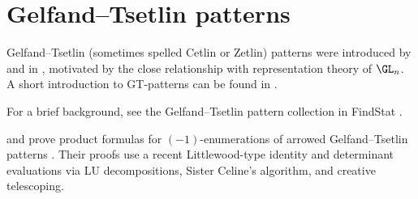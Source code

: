 

\section[gtpatterns]{Gelfand--Tsetlin patterns}

Gelfand--Tsetlin (sometimes spelled Cetlin or Zetlin) patterns
were introduced by  and 
in \cite{GelfandTsetlin1950},
motivated by the close relationship with representation theory of $\GL_n$.
A short introduction to GT-patterns can be found in \cite[p.~103]{StanleyEC2}.

For a brief background, see the Gelfand--Tsetlin pattern collection in
FindStat \cite{FindStatGelfandTsetlinPatterns}.

 and  prove product formulas
for $(-1)$-enumerations of arrowed Gelfand--Tsetlin patterns
\cite{FischerSchreierAigner2023x}.  Their proofs use a recent
Littlewood-type identity and determinant evaluations via LU decompositions,
Sister Celine's algorithm, and creative telescoping.



